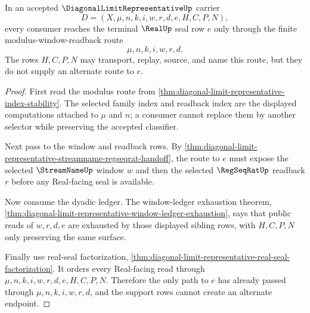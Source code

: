 \begin{theorem}
\label{thm:diagonal-limit-representative-modulus-window-readback-package}
In an accepted $\DiagonalLimitRepresentativeUp$ carrier
$$
D=(X,\mu,n,k,i,w,r,d,e,H,C,P,N),
$$
every consumer reaches the terminal $\RealUp$ seal row $e$ only through the finite modulus-window-readback route
$$
\mu,n,k,i,w,r,d.
$$
The rows $H,C,P,N$ may transport, replay, source, and name this route, but they do not supply an alternate route to $e$.
\end{theorem}
\begin{proof}
First read the modulus route from \autoref{thm:diagonal-limit-representative-index-stability}. The selected family index and readback index are the displayed computations attached to $\mu$ and $n$; a consumer cannot replace them by another selector while preserving the accepted classifier.

Next pass to the window and readback rows. By \autoref{thm:diagonal-limit-representative-streamname-regseqrat-handoff}, the route to $e$ must expose the selected $\StreamNameUp$ window $w$ and then the selected $\RegSeqRatUp$ readback $r$ before any Real-facing seal is available.

Now consume the dyadic ledger. The window-ledger exhaustion theorem, \autoref{thm:diagonal-limit-representative-window-ledger-exhaustion}, says that public reads of $w,r,d,e$ are exhausted by those displayed sibling rows, with $H,C,P,N$ only preserving the same surface.

Finally use real-seal factorization, \autoref{thm:diagonal-limit-representative-real-seal-factorization}. It orders every Real-facing read through $\mu,n,k,i,w,r,d,e,H,C,P,N$. Therefore the only path to $e$ has already passed through $\mu,n,k,i,w,r,d$, and the support rows cannot create an alternate endpoint.
\end{proof}

